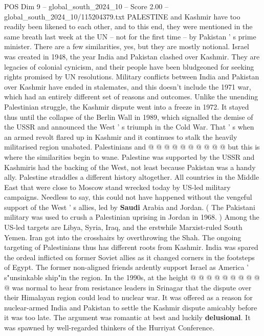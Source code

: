 \begin{textsample}{POS Dim 9 – global\_south\_2024\_10 – Score 2.00 – global\_south\_2024\_10/115204379.txt}  \label{ex:f9_pos_165}
PALESTINE and Kashmir have too readily been likened to each other, and to this end, they were mentioned in the same breath last week at the UN -- not for the first time -- by Pakistan ' s prime minister.
There are a few similarities, yes, but they are mostly notional.
Israel was created in 1948, the year India and Pakistan clashed over Kashmir.
They are legacies of colonial cynicism, and their people have been bludgeoned for seeking rights promised by UN resolutions.
Military conflicts between India and Pakistan over Kashmir have ended in stalemates, and this doesn't include the 1971 war, which had an entirely different set of reasons and outcomes.
Unlike the unending Palestinian struggle, the Kashmir dispute went into a freeze in 1972.
It stayed thus until the collapse of the Berlin Wall in 1989, which signalled the demise of the USSR and announced the West ' s triumph in the Cold War.
That ' s when an armed revolt flared up in Kashmir and it continues to stalk the heavily militarised region unabated.
Palestinians and @ @ @ @ @ @ @ @ @ @ but this is where the similarities begin to wane.
Palestine was supported by the USSR and Kashmiris had the backing of the West, not least because Pakistan was a handy ally.
Palestine straddles a different history altogether.
All countries in the Middle East that were close to Moscow stand wrecked today by US-led military campaigns.
Needless to say, this could not have happened without the vengeful support of the West ' s allies, led by \textbf{Saudi} Arabia and Jordan. ( The Pakistani military was used to crush a Palestinian uprising in Jordan in 1968. ) Among the US-led targets are Libya, Syria, Iraq, and the erstwhile Marxist-ruled South Yemen.
Iran got into the crosshairs by overthrowing the Shah.
The ongoing targeting of Palestinians thus has different roots from Kashmir.
India was spared the ordeal inflicted on former Soviet allies as it changed corners in the footsteps of Egypt.
The former non-aligned friends ardently support Israel as America ' s"unsinkable ship"in the region.
In the 1990s, at the height @ @ @ @ @ @ @ @ @ @ was normal to hear from resistance leaders in Srinagar that the dispute over their Himalayan region could lead to nuclear war.
It was offered as a reason for nuclear-armed India and Pakistan to settle the Kashmir dispute amicably before it was too late.
The argument was romantic at best and luckily \textbf{delusional}.
It was spawned by well-regarded thinkers of the Hurriyat Conference.

\end{textsample}
